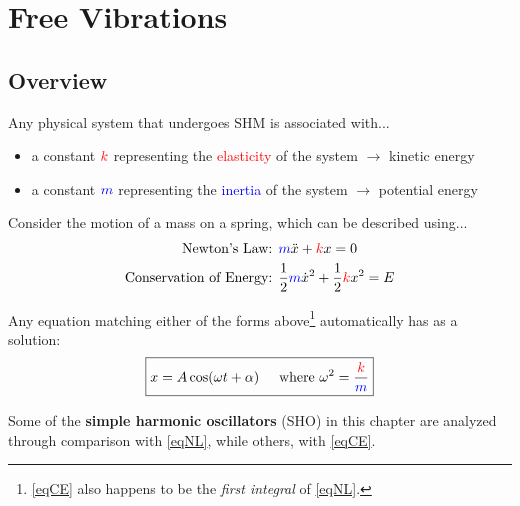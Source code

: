 \documentclass[11pt,letterpaper,titlepage,oneside]{book}
\newcommand{\htab}{\hspace{0.5cm}}
\newcommand{\where}{\htab\text{where }}
\begin{document}
\chapter{Free Vibrations}

\section{Overview}
Any physical system that undergoes SHM is associated with...
\begin{itemize}
	\item a constant $\color{red}{k}$ representing the \textcolor{red}{elasticity} of the system $\longrightarrow$ kinetic energy
	\item a constant $\color{blue}{m}$ representing the \textcolor{blue}{inertia} of the system $\longrightarrow$ potential energy
\end{itemize}

Consider the motion of a mass on a spring, which can be described using...
\begin{align}
	\text{Newton's Law: }&
	\textcolor{blue}{m}\ddot{x} + \textcolor{red}{k}x = 0 \label{eqNL} \\
	\text{Conservation of Energy: }&
	\frac{1}{2}\textcolor{blue}{m}\dot{x}^2 + \frac{1}{2}\textcolor{red}{k}x^2 = E \label{eqCE}
\end{align}

Any equation matching either of the forms above\footnote{\eqref{eqCE} also happens to be the \textit{first integral} of  \eqref{eqNL}.} automatically has as a solution:
\begin{equation}
\boxed{x = A \cos(\omega t+\alpha)\where\omega^2 = \frac{\color{red}{k}}{\color{blue}m}} \label{eqSHMsoln}
\end{equation}

Some of the \textbf{simple harmonic oscillators} (SHO) in this chapter are analyzed through comparison with \eqref{eqNL}, while others, with \eqref{eqCE}.
\end{document}
